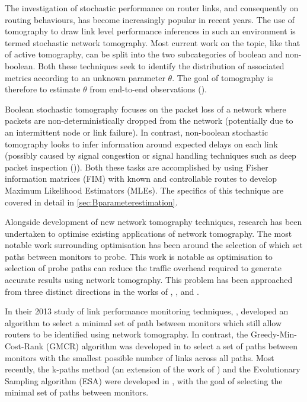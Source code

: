 The investigation of stochastic performance on router links, and consequently on routing behaviours, has become increasingly popular in recent years. The use of tomography to draw link level performance inferences in such an environment is termed stochastic network tomography. Most current work on the topic, like that of active tomography, can be split into the two subcategories of boolean and non-boolean. Both these techniques seek to identify the distribution of associated metrics according to an unknown parameter $\theta$. The goal of tomography is therefore to estimate $\theta$ from end-to-end observations (\cite{he_fisher_2015}).\par
Boolean stochastic tomography focuses on the packet loss of a network where packets are non-deterministically dropped from the network (potentially due to an intermittent node or link failure). In contrast, non-boolean stochastic tomography looks to infer information around expected delays on each link (possibly caused by signal congestion or signal handling techniques such as deep packet inspection (\cite{el-maghraby_survey_2017})). Both these tasks are accomplished by using Fisher information matrices (FIM) with known and controllable routes to develop Maximum Likelihood Estimators (MLEs). The specifics of this technique are covered in detail in \cref{sec:Bparameterestimation}.\par
Alongside development of new network tomography techniques, research has been undertaken to optimise existing applications of network tomography. The most notable work surrounding optimisation has been around the selection of which set paths between monitors to probe. This work is notable as optimisation to selection of probe paths can reduce the traffic overhead required to generate accurate results using network tomography. This problem has been approached from three distinct directions in the works of \cite{zheng_minimizing_2013}, \cite{tootaghaj_parsimonious_2018}, and \cite{rahali_unicast_2019}.\par
In their 2013 study of link performance monitoring techniques, \cite{zheng_minimizing_2013}, developed an algorithm to select a minimal set of path between monitors which still allow routers to be identified using network tomography. In contrast, the Greedy-Min-Cost-Rank (GMCR) algorithm was developed in \cite{tootaghaj_parsimonious_2018} to select a set of paths between monitors with the smallest possible number of links across all paths. Most recently, the k-paths method (an extension of the work of \cite{lawrence_network_2006}) and the Evolutionary Sampling algorithm (ESA) were developed in \cite{rahali_unicast_2019}, with the goal of selecting the minimal set of paths between monitors.\par
